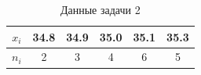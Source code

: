 \begin{table}[H]
\centering
\caption{Данные задачи 2}
\begin{tabular}{|c|c|c|c|c|c|}
\hline
$x_i$ & 34.8 & 34.9 & 35.0 & 35.1 & 35.3 \\
\hline
$n_i$ & 2 & 3 & 4 & 6 & 5 \\
\hline
\end{tabular}
\end{table}